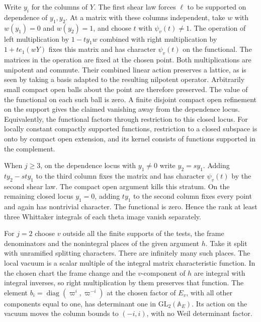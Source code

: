 Write \(y_i\) for the columns of \(Y\). The first shear law forces
\(\ell\) to be supported on dependence of \(y_1,y_2\). At a matrix
with these columns independent, take \(w\) with \(w(y_1)=0\) and
\(w(y_2)=1\), and choose \(t\) with \(\psi_v(t)\ne1\).
The operation of left multiplication by \(1-t y_1w\) combined
with right multiplication by \(1+t e_1(wY)\) fixes this matrix and
has character \(\psi_v(t)\) on the functional. The matrices in the
operation are fixed at the chosen point. Both multiplications are
unipotent and commute. Their combined linear action preserves a
lattice, as is seen by taking a basis adapted to the resulting
nilpotent operator. Arbitrarily small compact open balls about the
point are therefore preserved. The value of the functional on each
such ball is zero. A finite disjoint compact open refinement on the
support gives the claimed vanishing away from the dependence locus.
Equivalently, the functional factors through restriction to this
closed locus. For locally constant compactly supported functions,
restriction to a closed subspace is onto by compact open extension,
and its kernel consists of functions supported in the complement.

When \(j\ge3\), on the dependence locus with \(y_1\ne0\) write
\(y_2=s y_1\). Adding \(t y_2-s t y_1\) to the third column fixes
the matrix and has character \(\psi_v(t)\) by the second shear law.
The compact open argument kills this stratum. On the remaining
closed locus \(y_1=0\), adding \(t y_1\) to the second column fixes
every point and again has nontrivial character. The functional is
zero. Hence the rank at least three Whittaker integrals of each
theta image vanish separately.

For \(j=2\) choose \(v\) outside all the finite supports of the
tests, the frame denominators and the nonintegral places of the given
argument \(h\). Take it split with unramified splitting characters.
There are infinitely many such places. The local vacuum is a scalar
multiple of the integral matrix characteristic function. In the
chosen chart the frame change and the \(v\)-component of \(h\) are
integral with integral inverses, so right multiplication by them
preserves that function. The element \(b_i=\operatorname{diag}
(\varpi^i,\varpi^{-i})\) at the chosen factor of \(E_v\), with all
other components equal to one, has determinant one in
\(\mathrm{GL}_2(\mathbb A_E)\). Its action on the vacuum moves the
column bounds to \((-i,i)\), with no Weil determinant factor.

